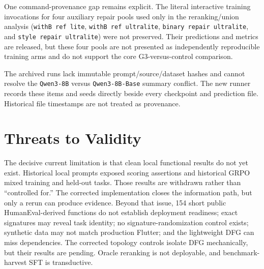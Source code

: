 \documentclass[11pt]{article}
\begin{document}
One command-provenance gap remains explicit. The literal interactive training invocations for four auxiliary repair pools used only in the reranking/union analysis (\texttt{withB ref lite}, \texttt{withB ref ultralite}, \texttt{binary repair ultralite}, and \texttt{style repair ultralite}) were not preserved. Their predictions and metrics are released, but these four pools are not presented as independently reproducible training arms and do not support the core G3-versus-control comparison.

The archived runs lack immutable prompt/source/dataset hashes and cannot resolve the \texttt{Qwen3-8B} versus \texttt{Qwen3-8B-Base} summary conflict. The new runner records these items and seeds directly beside every checkpoint and prediction file. Historical file timestamps are not treated as provenance.

\section{Threats to Validity}

The decisive current limitation is that clean local functional results do not yet exist. Historical local prompts exposed scoring assertions and historical GRPO mixed training and held-out tasks. Those results are withdrawn rather than ``controlled for.'' The corrected implementation closes the information path, but only a rerun can produce evidence. Beyond that issue, 154 short public HumanEval-derived functions do not establish deployment readiness; exact signatures may reveal task identity; no signature-randomization control exists; synthetic data may not match production Flutter; and the lightweight DFG can miss dependencies. The corrected topology controls isolate DFG mechanically, but their results are pending. Oracle reranking is not deployable, and benchmark-harvest SFT is transductive.
\end{document}
